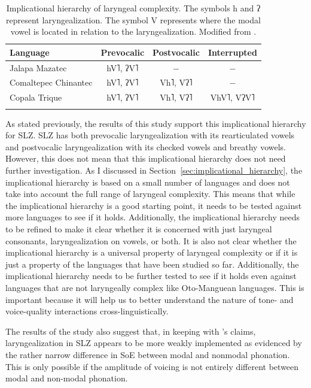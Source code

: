 \begin{table}[h!]
    \centering
    \caption{Implicational hierarchy of laryngeal complexity. The symbols h and ʔ represent laryngealization. The symbol V represents where the modal vowel is located in relation to the laryngealization. Modified from \citet{silvermanLaryngealComplexityOtomanguean1997}.} 
    \label{tab:implicational_hierarchy_repeat}
    \begin{tabular}{lccc}
        \lsptoprule
        \textbf{Language} & \textbf{Prevocalic} & \textbf{Postvocalic} & \textbf{Interrupted} \\
        \hline 
        Jalapa Mazatec & hV˥, ʔV˥ & $-$ & $-$ \\
        Comaltepec Chinantec & hV˥, ʔV˥ & Vh˥, Vʔ˥ & $-$ \\
        Copala Trique & hV˥, ʔV˥ & Vh˥, Vʔ˥ & VhV˥, VʔV˥ \\
        \lspbottomrule
    \end{tabular}
\end{table}

As stated previously, the results of this study support this implicational hierarchy for SLZ. SLZ has both prevocalic laryngealization with its rearticulated vowels and postvocalic laryngealization with its checked vowels and breathy vowels. However, this does not mean that this implicational hierarchy does not need further investigation. As I discussed in Section~\ref{sec:implicational_hierarchy}, the implicational hierarchy is based on a small number of languages and does not take into account the full range of laryngeal complexity. This means that while the implicational hierarchy is a good starting point, it needs to be tested against more languages to see if it holds. Additionally, the implicational hierarchy needs to be refined to make it clear whether it is concerned with just laryngeal consonants, laryngealization on vowels, or both. It is also not clear whether the implicational hierarchy is a universal property of laryngeal complexity or if it is just a property of the languages that have been studied so far. Additionally, the implicational hierarchy needs to be further tested to see if it holds even against languages that are not laryngeally complex like Oto-Manguean languages. This is important because it will help us to better understand the nature of tone- and voice-quality interactions cross-linguistically.

The results of the study also suggest that, in keeping with \citeauthor{silvermanLaryngealComplexityOtomanguean1997}'s \citeyear{silvermanLaryngealComplexityOtomanguean1997} claims, laryngealization in SLZ appears to be more weakly implemented as evidenced by the rather narrow difference in SoE between modal and nonmodal phonation. This is only possible if the amplitude of voicing is not entirely different between modal and non-modal phonation.


